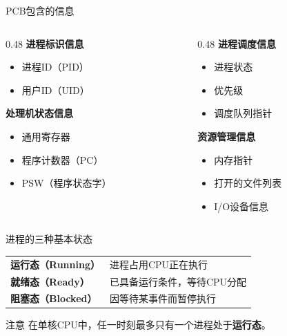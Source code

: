 \documentclass[10pt, aspectratio=169]{beamer}
\begin{document}
\begin{frame}{PCB包含的信息}
    \begin{columns}
        \begin{column}{0.48\textwidth}
            \textbf{进程标识信息}
            \begin{itemize}
                \item 进程ID（PID）
                \item 用户ID（UID）
            \end{itemize}
            \textbf{处理机状态信息}
            \begin{itemize}
                \item 通用寄存器
                \item 程序计数器（PC）
                \item PSW（程序状态字）
            \end{itemize}
        \end{column}
        \begin{column}{0.48\textwidth}
            \textbf{进程调度信息}
            \begin{itemize}
                \item 进程状态
                \item 优先级
                \item 调度队列指针
            \end{itemize}
            \textbf{资源管理信息}
            \begin{itemize}
                \item 内存指针
                \item 打开的文件列表
                \item I/O设备信息
            \end{itemize}
        \end{column}
    \end{columns}
\end{frame}

\begin{frame}{进程的三种基本状态}
    \begin{center}
        \begin{tabular}{ll}
            \textbf{运行态（Running）} & 进程占用CPU正在执行 \\
            \textbf{就绪态（Ready）} & 已具备运行条件，等待CPU分配 \\
            \textbf{阻塞态（Blocked）} & 因等待某事件而暂停执行 \\
        \end{tabular}
    \end{center}
    \vspace{0.5em}
    \begin{block}{注意}
        在单核CPU中，任一时刻最多只有一个进程处于\textbf{运行态}。
    \end{block}
\end{frame}
\end{document}
